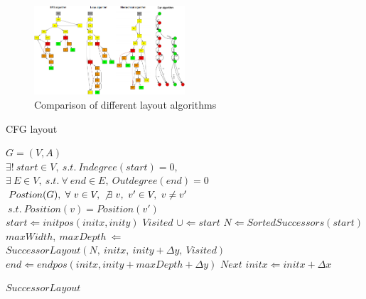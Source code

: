 \documentclass[conference,10pt,twocolumn]{./IEEE/IEEEtran}
\begin{document}
\begin{figure}[h]
\center
  \includegraphics[width=0.5\textwidth]{layout_demo.png}
  \caption{Comparison of different layout algorithms}
  \label{dm1}
\end{figure}

\begin{algorithm}                      %
\caption{CFG layout}          %
\label{alg1}                           %
\begin{algorithmic}[1]               %

    \REQUIRE $G=(V,A)$\\ $\exists !\ start \in V,\ s.t.\ Indegree(start)=0,$\\ $\exists\ E \in V,\   s.t. \ \forall \ end \in E, \ Outdegree(end)=0$
    \ENSURE $Postion(G),\ \forall\ v\in V, \ \not\exists \ v,\ v' \in V,\  v \not= v'$\\$\ s.t. \ Position(v)=Position(v')$\\
    \STATE $start \Leftarrow initpos(initx,inity)$
\STATE $Visited$  $\cup \Leftarrow start$
\STATE $N \Leftarrow SortedSuccessors(start)$
 \STATE $maxWidth,\ maxDepth\  \Leftarrow$\\$SuccessorLayout(N,\ initx,\ inity+\Delta y,\ Visited)$ 
      \STATE $end \Leftarrow endpos(initx,inity+maxDepth+\Delta y)$
       \STATE $Next$	
        \STATE $initx \Leftarrow initx+\Delta x$
    \ENDFOR
\RETURN
\end{algorithmic}

\begin{algorithmic}
\STATE $ SuccessorLayout$
\end{algorithmic}



\end{algorithm}
\end{document}
